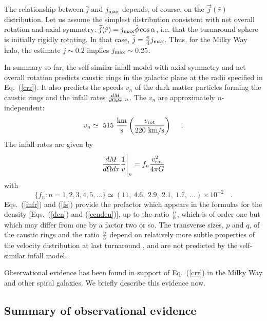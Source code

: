 \documentclass[aps,prd,preprint,tightenlines,floatfix,showpacs,groupedaddress]{revtex4}
\begin{document}
The relationship between $\bar{j}$ and $j_{\rm max}$ depends, of 
course, on the $\vec{j}(\hat{r})$ distribution.  Let us assume the
simplest distribution consistent with net overall rotation and axial 
symmetry:  $\vec{j}(\hat{r}) = j_{\rm max} \hat{\phi} \cos\alpha$,
i.e. that the turnaround sphere is initially rigidly rotating.  In 
that case, $\bar{j} = {\pi \over 4} j_{\rm max}$.  Thus, for the 
Milky Way halo, the estimate $\bar{j} \sim 0.2$ implies 
$j_{\rm max} \sim 0.25$.  

In summary so far, the self similar infall model with axial symmetry 
and net overall rotation predicts caustic rings in the galactic plane 
at the radii specified in Eq.~(\ref{crr}).  It also predicts the speeds 
$v_n$ of the dark matter particles forming the caustic rings and the
infall rates ${dM \over d\Omega d\tau}|_n$.  The $v_n$ are approximately 
$n$-independent:
\begin{equation}
v_n \simeq~515~{\rm km \over s}
\left({v_{\rm rot} \over 220~{\rm km/s}}\right)~~~\ .
\label{spee}
\end{equation}
The infall rates are given by
\begin{equation}
{dM \over d\Omega d\tau}{1 \over v}\Bigg|_n
= f_n {v_{\rm rot}^2 \over 4 \pi G}
\label{infr}
\end{equation}
with
\begin{equation}
\{f_n : n = 1,2,3,4,5, ... \} \simeq
(11,~4.6,~2.9,~2.1,~1.7,~...)\times 10^{-2}~~~\ .
\label{fs}
\end{equation}
Eqs.~(\ref{infr}) and (\ref{fs}) provide the prefactor which
appears in the formulas for the density [Eqs.~(\ref{den})
and (\ref{cenden})], up to the ratio ${v \over b}$, which is
of order one but which may differ from one by a factor two or
so.  The transverse sizes, $p$ and $q$, of the caustic rings 
and the ratio ${v \over b}$ depend on relatively more subtle 
properties of the velocity distribution at last turnaround 
\cite{sing}, and are not predicted by the self-similar infall 
model.

Observational evidence has been found in support of Eq.~(\ref{crr}) 
in the Milky Way and other spiral galaxies.  We briefly describe 
this evidence now.

\subsection{Summary of observational evidence}
\end{document}
